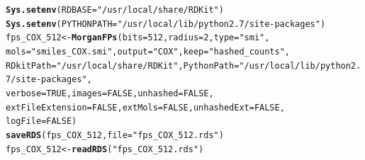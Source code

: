 \documentclass[twoside,a4wide,12pt]{article}\usepackage[]{graphicx}\usepackage[]{color}
\makeatletter
\newcommand{\hlnum}[1]{\textcolor[rgb]{0.686,0.059,0.569}{#1}}%
\newcommand{\hlstr}[1]{\textcolor[rgb]{0.192,0.494,0.8}{#1}}%
\newcommand{\hlstd}[1]{\textcolor[rgb]{0.345,0.345,0.345}{#1}}%
\newcommand{\hlkwb}[1]{\textcolor[rgb]{0.69,0.353,0.396}{#1}}%
\newcommand{\hlkwc}[1]{\textcolor[rgb]{0.333,0.667,0.333}{#1}}%
\newcommand{\hlkwd}[1]{\textcolor[rgb]{0.737,0.353,0.396}{\textbf{#1}}}%
\newenvironment{kframe}{%
 \def\at@end@of@kframe{}%
 \ifinner\ifhmode%
  \def\at@end@of@kframe{\end{minipage}}%
  \begin{minipage}{\columnwidth}%
 \fi\fi%
 \def\FrameCommand##1{\hskip\@totalleftmargin \hskip-\fboxsep
 \colorbox{shadecolor}{##1}\hskip-\fboxsep
     \hskip-\linewidth \hskip-\@totalleftmargin \hskip\columnwidth}%
 \MakeFramed {\advance\hsize-\width
   \@totalleftmargin\z@ \linewidth\hsize
   \@setminipage}}%
 {\par\unskip\endMakeFramed%
 \at@end@of@kframe}
\newenvironment{knitrout}{}{} %
\makeatother
\begin{document}
\begin{knitrout}
\color{fgcolor}\begin{kframe}
\begin{alltt}
\hlkwd{Sys.setenv}\hlstd{(}\hlkwc{RDBASE} \hlstd{=} \hlstr{"/usr/local/share/RDKit"}\hlstd{)}
\hlkwd{Sys.setenv}\hlstd{(}\hlkwc{PYTHONPATH} \hlstd{=} \hlstr{"/usr/local/lib/python2.7/site-packages"}\hlstd{)}
\hlstd{fps_COX_512} \hlkwb{<-} \hlkwd{MorganFPs}\hlstd{(}\hlkwc{bits} \hlstd{=} \hlnum{512}\hlstd{,} \hlkwc{radius} \hlstd{=} \hlnum{2}\hlstd{,} \hlkwc{type} \hlstd{=} \hlstr{"smi"}\hlstd{,}
    \hlkwc{mols} \hlstd{=} \hlstr{"smiles_COX.smi"}\hlstd{,} \hlkwc{output} \hlstd{=} \hlstr{"COX"}\hlstd{,} \hlkwc{keep} \hlstd{=} \hlstr{"hashed_counts"}\hlstd{,}
    \hlkwc{RDkitPath} \hlstd{=} \hlstr{"/usr/local/share/RDKit"}\hlstd{,} \hlkwc{PythonPath} \hlstd{=} \hlstr{"/usr/local/lib/python2.7/site-packages"}\hlstd{,}
    \hlkwc{verbose} \hlstd{=} \hlnum{TRUE}\hlstd{,} \hlkwc{images} \hlstd{=} \hlnum{FALSE}\hlstd{,} \hlkwc{unhashed} \hlstd{=} \hlnum{FALSE}\hlstd{,}
    \hlkwc{extFileExtension} \hlstd{=} \hlnum{FALSE}\hlstd{,} \hlkwc{extMols} \hlstd{=} \hlnum{FALSE}\hlstd{,} \hlkwc{unhashedExt} \hlstd{=} \hlnum{FALSE}\hlstd{,}
    \hlkwc{logFile} \hlstd{=} \hlnum{FALSE}\hlstd{)}
\hlkwd{saveRDS}\hlstd{(fps_COX_512,} \hlkwc{file} \hlstd{=} \hlstr{"fps_COX_512.rds"}\hlstd{)}
\hlstd{fps_COX_512} \hlkwb{<-} \hlkwd{readRDS}\hlstd{(}\hlstr{"fps_COX_512.rds"}\hlstd{)}
\end{alltt}
\end{kframe}
\end{knitrout}
\end{document}
